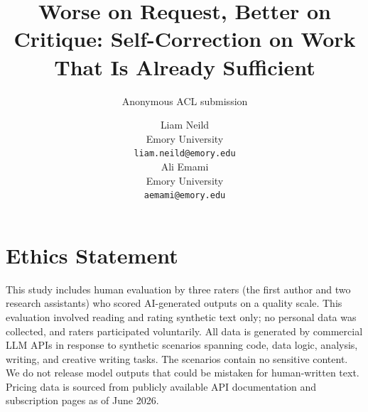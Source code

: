 \documentclass[11pt]{article}
\title{Worse on Request, Better on Critique: Self-Correction on Work That Is Already Sufficient}
\author{Anonymous ACL submission}
\author{
    Liam Neild \\
    Emory University \\
    \texttt{liam.neild@emory.edu} \\\And
    Ali Emami \\
    Emory University \\
    \texttt{aemami@emory.edu}
  }
\begin{document}
\maketitle







\label{endofbody}   %




\section*{Ethics Statement}

This study includes human evaluation by three raters (the first author and two research assistants) who scored AI-generated outputs on a quality scale. This evaluation involved reading and rating synthetic text only; no personal data was collected, and raters participated voluntarily. All data is generated by commercial LLM APIs in response to synthetic scenarios spanning code, data logic, analysis, writing, and creative writing tasks. The scenarios contain no sensitive content. We do not release model outputs that could be mistaken for human-written text. Pricing data is sourced from publicly available API documentation and subscription pages as of June 2026.



\appendix

\end{document}
